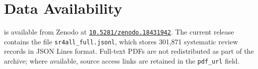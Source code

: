 \section*{Data Availability}

\webisSRCorpus{} is available from Zenodo at \href{https://doi.org/10.5281/zenodo.18431942}{\texttt{10.5281/zenodo.18431942}}. The current release contains the file \texttt{sr4all\_full.jsonl}, which stores 301,871 systematic review records in JSON Lines format. Full-text PDFs are not redistributed as part of the archive; where available, source access links are retained in the \texttt{pdf\_url} field.
